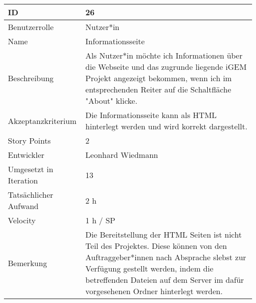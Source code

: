 \begin{tabularx}{\textwidth}{|p{}|X|}
	\hline
	ID & 26\\
	\hline
	Benutzerrolle & Nutzer*in\\
	\hline
	Name & Informationsseite\\
	\hline
	Beschreibung & Als Nutzer*in möchte ich Informationen über die Webseite und das zugrunde liegende iGEM Projekt angezeigt bekommen, wenn ich im entsprechenden Reiter auf die Schaltfläche "About" klicke.\\
	\hline
	Akzeptanzkriterium & Die Informationsseite kann als HTML hinterlegt werden und wird korrekt dargestellt.\\
	\hline
	Story Points & 2\\
	\hline
	Entwickler & Leonhard Wiedmann\\
	\hline
	Umgesetzt in Iteration & 13\\
	\hline
	Tatsächlicher Aufwand & 2 h\\
	\hline
	Velocity & 1 h / SP\\
	\hline
	Bemerkung & Die Bereitstellung der HTML Seiten ist nicht Teil des Projektes. Diese können von den Auftraggeber*innen nach Absprache slebst zur Verfügung gestellt werden, indem die betreffenden Dateien auf dem Server im dafür vorgesehenen Ordner hinterlegt werden.\\
	\hline
\end{tabularx}
\vspace{20pt}

